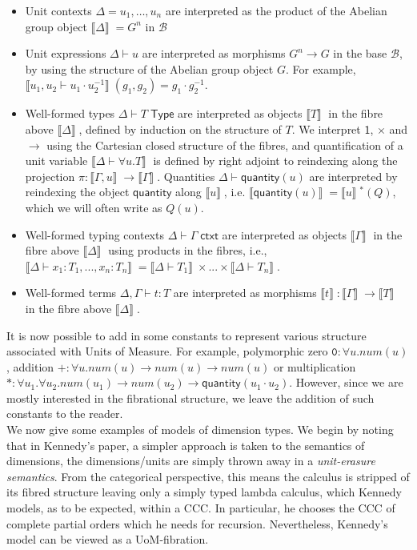 \documentclass[a4paper,UKenglish]{lipics}
\newcommand{\UoM}{Units of Measure\xspace}
\newcommand{\ra}{\rightarrow}
\newcommand{\msf}[1]{\mathsf{#1}} %
\newcommand{\B}{\mathcal{B}}
\newcommand{\sem}[1]{\ensuremath{\llbracket #1 \rrbracket} \;}
\newcommand{\num}{\msf{quantity}}
\begin{document}
\begin{itemize}
\item Unit contexts $\Delta = u_1, \ldots, u_n$ are interpreted as the product of the Abelian group object $\sem{\Delta} = G^n$ in $\B$
\item Unit expressions $\Delta\vdash u$ are interpreted as morphisms $G^n \ra G$ in the base $\B$, by using the structure of the Abelian group object $G$. For example, $\sem{u_1, u_2 \vdash u_1 \cdot u_2^{-1}}(g_1,g_2) = g_1 \cdot g_2^{-1}$.

\item Well-formed types $\Delta \vdash T \; \msf{ Type}$ are interpreted as objects $\sem{T}$ in the fibre above $\sem{\Delta}$,  defined by induction on the structure of $T$. We interpret $\msf{1}$, $\times$ and $\rightarrow$ using the Cartesian closed structure of the fibres, and quantification of a unit variable $\sem{\Delta \vdash \forall u. T}$ is defined by right adjoint to reindexing along the projection $\pi: \sem{\Gamma, u} \rightarrow \sem{\Gamma}$. Quantities $\Delta \vdash \num(u)$ are interpreted by reindexing the object $\num$ along $\sem{u}$, i.e. $\sem{\num(u)} = \sem{u}^\ast (Q)$, which we will often write as $Q(u)$.

\item Well-formed typing contexts $\Delta \vdash \Gamma \; \msf{ ctxt}$ are interpreted as objects $\sem{\Gamma}$ in the fibre above $\sem{\Delta}$ using products in the fibres, i.e., \\$\sem{\Delta \vdash x_1 : T_1 ,..., x_n:T_n} = \sem{\Delta \vdash T_1} \times ... \times \sem{\Delta \vdash T_n}$.

\item Well-formed terms $\Delta, \Gamma \vdash t : T$ are interpreted as morphisms $\sem{t} : \sem{\Gamma} \ra \sem{T}$ in the fibre above $\sem{\Delta}$.
\end{itemize}

It is now possible to add in some constants to represent various structure associated with \UoM. For example, polymorphic zero $\mathtt{0} : \forall u . num(u)$, addition $\mathtt{+}: \forall u. num(u) \rightarrow num(u) \rightarrow num(u)$ or multiplication $\mathtt{*} : \forall u_1 . \forall u_2 . num(u_1) \rightarrow num(u_2) \rightarrow \num(u_1 \cdot u_2)$. However, since we are mostly interested in the fibrational structure, we leave the addition of such constants to the reader.\\

We now give some examples of models of dimension types. We begin by noting that in Kennedy's paper, a simpler approach is taken to the semantics of
dimensions, the dimensions/units are simply thrown away in a {\em unit-erasure semantics}. From the categorical perspective, this means the calculus is stripped of its fibred structure leaving only a simply typed lambda calculus, which Kennedy models, as to be expected, within a CCC. In particular, he chooses the CCC of complete partial orders which he needs for recursion. Nevertheless, Kennedy's model can be viewed as a UoM-fibration.
\end{document}
